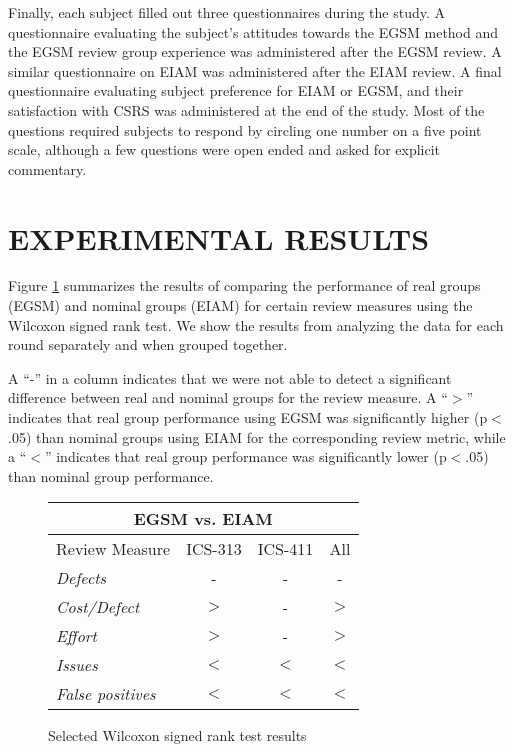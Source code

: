 Finally, each subject filled out three questionnaires during the study.  A
questionnaire evaluating the subject's attitudes towards the EGSM method
and the EGSM review group experience was administered after the EGSM
review. A similar questionnaire on EIAM was administered after the EIAM
review. A final questionnaire evaluating subject preference for EIAM or
EGSM, and their satisfaction with CSRS was administered at the end of the
study.  Most of the questions required subjects to respond by circling
one number on a five point scale, although a few questions were open ended
and asked for explicit commentary. 


\section{EXPERIMENTAL RESULTS}

Figure \ref{fig:wilcoxon-results} summarizes the results of comparing the
performance of real groups (EGSM) and nominal groups (EIAM) for certain
review measures using the Wilcoxon signed rank test.  We show the results
from analyzing the data for each round separately and when grouped
together.

A ``-'' in a column indicates that we were not able to detect a significant
difference between real and nominal groups for the review measure. A
``$>$'' indicates that real group performance using EGSM was significantly
higher (p$<$.05) than nominal groups using EIAM for the corresponding
review metric, while a ``$<$'' indicates that real group performance was
significantly lower (p$<$.05) than nominal group performance.


\begin{figure}[ht]
  \small
  \begin{center}
  \begin{tabular}{|l|c|c|c|}
  \multicolumn{4}{c}{EGSM vs. EIAM}\\
   \hline
Review Measure    & ICS-313 & ICS-411 & All \\
   \hline
{\em Defects}         & -       & -       & - \\
{\em Cost/Defect}     & $>$     & -       & $>$ \\  
{\em Effort}          & $>$     & -       & $>$ \\
{\em Issues}          & $<$     & $<$     & $<$ \\
{\em False positives} & $<$     & $<$     & $<$ \\
  \hline
   \end{tabular}
  \end{center}
 \caption{Selected Wilcoxon signed rank test results}
 \label{fig:wilcoxon-results}
\normalsize
\end{figure}


